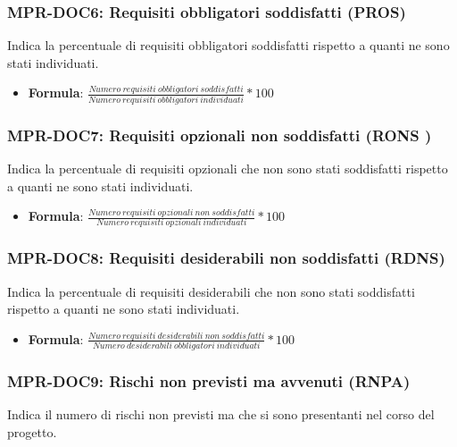 \subsubsection{MPR-DOC6: Requisiti obbligatori soddisfatti (PROS)} \label{_MPR-DOC6}
Indica la percentuale di requisiti obbligatori soddisfatti rispetto a quanti ne sono stati individuati.
\begin{itemize}
    \item \textbf{Formula}: \(\frac{Numero\ requisiti\ obbligatori\ soddisfatti}{Numero\ requisiti\  obbligatori\ individuati}*100\)
    
\end{itemize}

\subsubsection{MPR-DOC7: Requisiti opzionali non  soddisfatti (RONS )} \label{_MPR-DOC7}
Indica la percentuale di requisiti opzionali che non sono stati soddisfatti rispetto a quanti ne sono stati individuati.
\begin{itemize}
    \item \textbf{Formula}: \(\frac{Numero\ requisiti\ opzionali\ non\ soddisfatti}{Numero\ requisiti\  opzionali\ individuati}*100\)
    
\end{itemize}

\subsubsection{MPR-DOC8: Requisiti desiderabili non soddisfatti (RDNS)} \label{_MPR-DOC8}
Indica la percentuale di requisiti desiderabili che non sono stati  soddisfatti rispetto a quanti ne sono stati individuati.
\begin{itemize}
    \item \textbf{Formula}: \(\frac{Numero\ requisiti\ desiderabili\ non\ soddisfatti}{Numero\ desiderabili\  obbligatori\ individuati}*100\)
    
\end{itemize}

\subsubsection{MPR-DOC9: Rischi non previsti ma avvenuti (RNPA)} \label{_MPR-DOC9}
Indica il numero di rischi non previsti ma che si sono presentanti nel corso del progetto.






